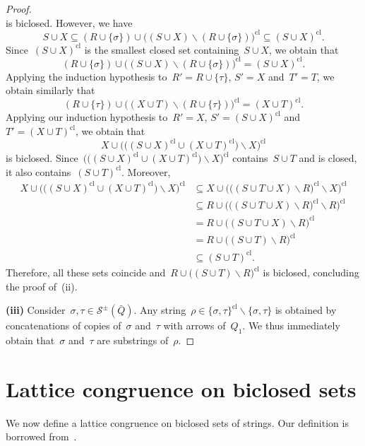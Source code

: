 \documentclass{amsart}
\theoremstyle{definition}
\newcommand{\ssm}{\smallsetminus} %
\newcommand{\strings}{\mathcal{S}} %
\newcommand{\closure}[1]{#1^{\mathrm{cl}}} %
\begin{document}
\begin{proof}
\[\]
is biclosed. However, we have
\[
S \cup X \subseteq (R \cup \{\sigma\}) \cup \closure{\big( ( S \cup X ) \ssm (R \cup \{\sigma\}) \big)} \subseteq \closure{(S \cup X)}.
\]
Since~$\closure{(S \cup X)}$ is the smallest closed set containing~$S \cup X$, we obtain that
\[
(R \cup \{\sigma\}) \cup \closure{\big( ( S \cup X ) \ssm (R \cup \{\sigma\}) \big)} = \closure{(S \cup X)}.
\]
Applying the induction hypothesis to~$R' = R \cup \{\tau\}$, $S' = X$ and~$T' = T$, we obtain similarly that
\[
(R \cup \{\tau\}) \cup \closure{\big( ( X \cup T ) \ssm (R \cup \{\tau\}) \big)} = \closure{(X \cup T)}.
\]
Applying our induction hypothesis to~$R' = X$, $S' = \closure{(S \cup X)}$ and~$T' = \closure{(X \cup T)}$, we obtain that
\[
X \cup \closure{\big( \big( \closure{(S \cup X)} \cup \closure{(X \cup T)} \big) \ssm X \big)}
\]
is biclosed. Since~$\closure{\big( \big( \closure{(S \cup X)} \cup \closure{(X \cup T)} \big) \ssm X \big)}$ contains~$S \cup T$ and is closed, it also contains~$\closure{(S \cup T)}$.
Moreover,
\begin{align*}
X \cup \closure{\big( \big( \closure{(S \cup X)} \cup \closure{(X \cup T)} \big) \ssm X \big)}
& \subseteq X \cup \closure{\big( \closure{\big( (S \cup T \cup X) \ssm R\big)} \ssm X \big)} \\
& \subseteq R \cup \closure{\big( \closure{\big( (S \cup T \cup X) \ssm R\big)} \ssm R \big)} \\
& = R \cup \closure{\big( (S \cup T \cup X) \ssm R \big)} \\
& = R \cup \closure{\big( (S \cup T) \ssm R \big)} \\
& \subseteq \closure{(S \cup T)}.
\end{align*}
Therefore, all these sets coincide and~$R \cup \closure{\big( (S \cup T) \ssm R \big)}$ is biclosed, concluding the proof of~(ii).

\medskip\noindent
{\bf (iii)}
Consider~$\sigma, \tau \in \strings^\pm(\bar Q)$.
Any string~$\rho \in \closure{\{\sigma, \tau\}} \ssm \{\sigma, \tau\}$ is obtained by concatenations of copies of~$\sigma$ and~$\tau$ with arrows of~$Q_1$.
We thus immediately obtain that~$\sigma$ and~$\tau$ are substrings of~$\rho$.
\end{proof}

\section{Lattice congruence on biclosed sets}
\label{sec:latticeCongruence}

We now define a lattice congruence on biclosed sets of strings.
Our definition is borrowed from~\cite[Sect.~7]{McConville}.
\end{document}
